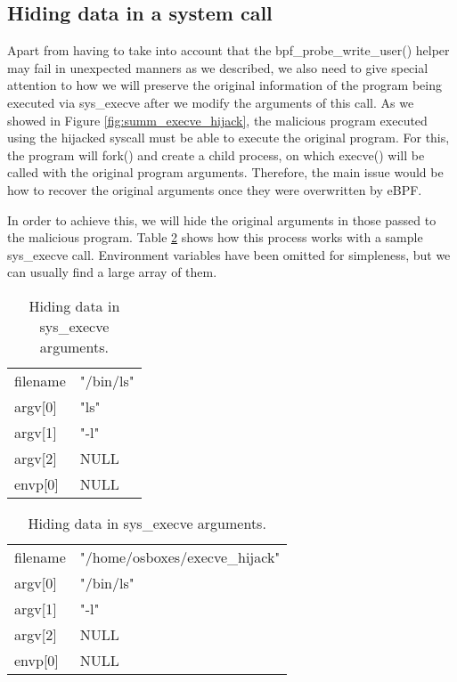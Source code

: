 \subsection{Hiding data in a system call}
Apart from having to take into account that the bpf\_probe\_write\_user() helper may fail in unexpected manners as we described, we also need to give special attention to how we will preserve the original information of the program being executed via sys\_execve after we modify the arguments of this call. As we showed in Figure \ref{fig:summ_execve_hijack}, the malicious program executed using the hijacked syscall must be able to execute the original program. For this, the program will fork() and create a child process, on which execve() will be called with the original program arguments. Therefore, the main issue would be how to recover the original arguments once they were overwritten by eBPF.

In order to achieve this, we will hide the original arguments in those passed to the malicious program. Table \ref{table:execve_args_hide} shows how this process works with a sample sys\_execve call. Environment variables have been omitted for simpleness, but we can usually find a large array of them.

\begin{table}[H]
\begin{tabular}{|>{\centering\arraybackslash}p{2cm}|>{\centering\arraybackslash}p{3cm}|}
\hline
\multicolumn{2}{|c|}{\textbf{ORIGINAL ARGUMENTS}}\\
\hline
\hline
filename & "/bin/ls"\\
\hline
argv[0] & "ls"\\
\hline
argv[1] & "-l"\\
\hline
argv[2] & NULL\\
\hline
envp[0] & NULL\\
\hline
\end{tabular}
\quad
\begin{tabular}{|>{\centering\arraybackslash}p{2cm}|>{\centering\arraybackslash}p{4cm}|}
\hline
\multicolumn{2}{|c|}{\textbf{MODIFIED ARGUMENTS}}\\
\hline
\hline
filename & "/home/osboxes/execve\_hijack"\\
\hline
argv[0] & "/bin/ls"\\
\hline
argv[1] & "-l"\\
\hline
argv[2] & NULL\\
\hline
envp[0] & NULL\\
\hline
\end{tabular}
\caption{Hiding data in sys\_execve arguments.}
\label{table:execve_args_hide}
\end{table}

